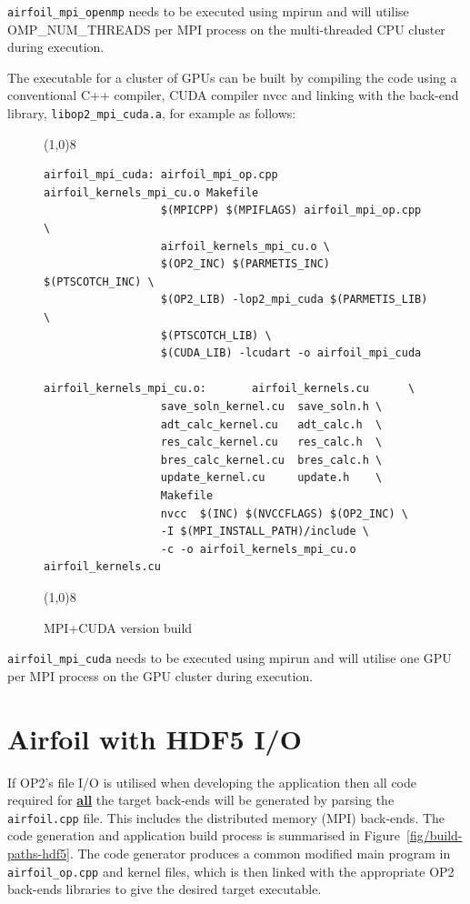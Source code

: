 \documentclass[11pt]{article}
\begin{document}
\noindent \texttt{airfoil\_mpi\_openmp} needs to be executed using mpirun and will utilise OMP\_NUM\_THREADS per MPI
process on the multi-threaded CPU cluster during execution. 

\newpage
\noindent The executable for a cluster of GPUs can be built by compiling the code using a conventional C++ compiler,
CUDA compiler nvcc and linking with the back-end library, \texttt{libop2\_mpi\_cuda.a}, for example as follows:

\begin{figure}[h]\small
\vspace{-0pt}\noindent\line(1,0){8}\vspace{-10pt}
\begin{lstlisting}
airfoil_mpi_cuda: airfoil_mpi_op.cpp airfoil_kernels_mpi_cu.o Makefile
                  $(MPICPP) $(MPIFLAGS) airfoil_mpi_op.cpp \
                  airfoil_kernels_mpi_cu.o \
                  $(OP2_INC) $(PARMETIS_INC) $(PTSCOTCH_INC) \
                  $(OP2_LIB) -lop2_mpi_cuda $(PARMETIS_LIB) \
                  $(PTSCOTCH_LIB) \
                  $(CUDA_LIB) -lcudart -o airfoil_mpi_cuda

airfoil_kernels_mpi_cu.o:       airfoil_kernels.cu      \
                  save_soln_kernel.cu  save_soln.h \
                  adt_calc_kernel.cu   adt_calc.h  \
                  res_calc_kernel.cu   res_calc.h  \
                  bres_calc_kernel.cu  bres_calc.h \
                  update_kernel.cu     update.h    \
                  Makefile
                  nvcc  $(INC) $(NVCCFLAGS) $(OP2_INC) \
                  -I $(MPI_INSTALL_PATH)/include \
                  -c -o airfoil_kernels_mpi_cu.o airfoil_kernels.cu
\end{lstlisting}\vspace{-10pt}
\vspace{-0pt}\noindent\line(1,0){8}\vspace{-10pt}
\caption{\small MPI+CUDA version build }
\normalsize\vspace{-10pt}\label{fig:mpi_cudabuild}
\end{figure}

\noindent \texttt{airfoil\_mpi\_cuda} needs to be executed using mpirun and will utilise one GPU per MPI process on the
GPU cluster during execution. 

\newpage
\section{Airfoil with HDF5 I/O}\label{hdf5}
If OP2's file I/O is utilised when developing the application then all code required for \underline{\textbf{all}} the
target back-ends will be generated by parsing the \texttt{airfoil.cpp} file. This includes the distributed memory (MPI)
back-ends. The code generation and application build process is summarised in Figure~\ref{fig/build-paths-hdf5}. The
code generator produces a common modified main program in \texttt{airfoil\_op.cpp} and kernel files, which is then
linked with the appropriate OP2 back-ends libraries to give the desired target executable. 
\end{document}
